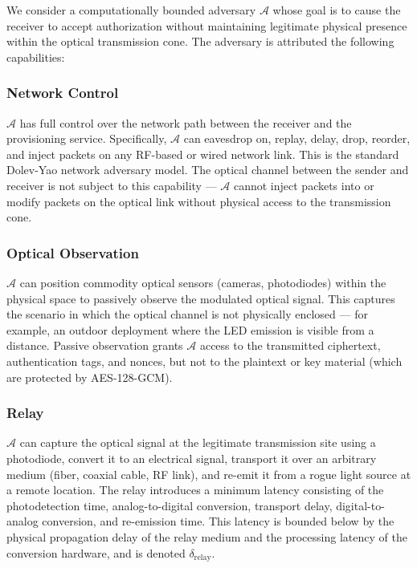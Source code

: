\documentclass[conference]{IEEEtran}
\begin{document}
We consider a computationally bounded adversary $\mathcal{A}$ whose goal is to cause the receiver to accept authorization without maintaining legitimate physical presence within the optical transmission cone. The adversary is attributed the following capabilities:

\subsubsection{Network Control}

$\mathcal{A}$ has full control over the network path between the receiver and the provisioning service. Specifically, $\mathcal{A}$ can eavesdrop on, replay, delay, drop, reorder, and inject packets on any RF-based or wired network link. This is the standard Dolev-Yao network adversary model. The optical channel between the sender and receiver is not subject to this capability — $\mathcal{A}$ cannot inject packets into or modify packets on the optical link without physical access to the transmission cone.

\subsubsection{Optical Observation}

$\mathcal{A}$ can position commodity optical sensors (cameras, photodiodes) within the physical space to passively observe the modulated optical signal. This captures the scenario in which the optical channel is not physically enclosed — for example, an outdoor deployment where the LED emission is visible from a distance. Passive observation grants $\mathcal{A}$ access to the transmitted ciphertext, authentication tags, and nonces, but not to the plaintext or key material (which are protected by AES-128-GCM).

\subsubsection{Relay}

$\mathcal{A}$ can capture the optical signal at the legitimate transmission site using a photodiode, convert it to an electrical signal, transport it over an arbitrary medium (fiber, coaxial cable, RF link), and re-emit it from a rogue light source at a remote location. The relay introduces a minimum latency consisting of the photodetection time, analog-to-digital conversion, transport delay, digital-to-analog conversion, and re-emission time. This latency is bounded below by the physical propagation delay of the relay medium and the processing latency of the conversion hardware, and is denoted $\delta_{\text{relay}}$.
\end{document}
